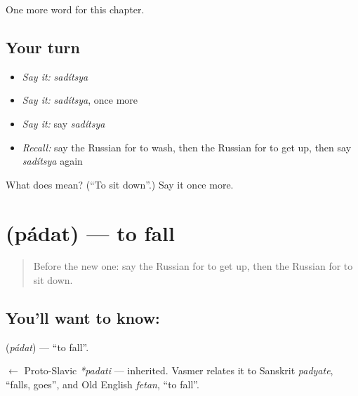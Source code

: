 \begin{grammarlens}[title={What you've built}]
One more word for this chapter.
\end{grammarlens}

\subsection*{Your turn}
\begin{itemize}
\raggedright
  \item \emph{Say it:} \emph{sadítsya}
  \item \emph{Say it:} \emph{sadítsya}, once more
  \item \emph{Say it:} say \emph{sadítsya}
  \item \emph{Recall:} say the Russian for to wash, then the Russian for to get up, then say \emph{sadítsya} again
\end{itemize}

\begin{tcolorbox}[breakable,colback=teal!4,colframe=teal!35!black,title={Before you move on}]
What does  mean? (\textquotedblleft{}To sit down\textquotedblright{}.) Say it once more.
\end{tcolorbox}
\section[\texorpdfstring{\ru{падать} (pádat)}{падать (pádat)}]{ (pádat) — to fall}

\label{lesson:RU-C132-to-fall}



\begin{quote}
Before the new one: say the Russian for to get up, then the Russian for to sit down.
\end{quote}

\subsection*{You'll want to know: }
\textbf{} (\emph{pádat}) — \textquotedblleft{}to fall\textquotedblright{}.

\begin{cousinweb}
\textbf{} $\leftarrow$ Proto-Slavic \emph{*padati} — inherited. Vasmer relates it to Sanskrit \emph{padyate}, \textquotedblleft{}falls, goes\textquotedblright{}, and Old English \emph{fetan}, \textquotedblleft{}to fall\textquotedblright{}.
\end{cousinweb}

